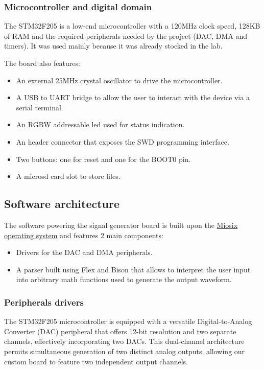 \subsubsection{Microcontroller and digital domain}

The STM32F205 is a low-end microcontroller with a 120MHz clock speed, 128KB of RAM and the required peripherals needed by the project (DAC, DMA and timers). It was used mainly because it was already stocked in the lab.

The board also features:
\begin{itemize}
      \item An external 25MHz crystal oscillator to drive the microcontroller.
      \item A USB to UART bridge to allow the user to interact with the device via a serial terminal.
      \item An RGBW addressable led used for status indication.
      \item An header connector that exposes the SWD programming interface.
      \item Two buttons: one for reset and one for the BOOT0 pin.
      \item A microsd card slot to store files.
\end{itemize}

\subsection{Software architecture}

The software powering the signal generator board is built upon the \href{https://github.com/NidasioAlberto/miosix-kernel}{Miosix operating system} and features 2 main components:
\begin{itemize}
      \item Drivers for the DAC and DMA peripherals.
      \item A parser built using Flex and Bison that allows to interpret the user input into arbitrary math functions used to generate the output waveform.
\end{itemize}

\subsubsection{Peripherals drivers}

The STM32F205 microcontroller is equipped with a versatile Digital-to-Analog Converter (DAC) peripheral that offers 12-bit resolution and two separate channels, effectively incorporating two DACs. This dual-channel architecture permits simultaneous generation of two distinct analog outputs, allowing our custom board to feature two independent output channels.

